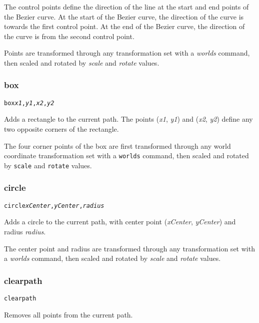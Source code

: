 The control points define the direction of the line at the start and
end points of the Bezier curve.
At the start of the Bezier curve, the direction of the curve is towards
the first control point.
At the end of the Bezier curve, the direction of the curve is from
the second control point.

Points are transformed through any
transformation set with a \textit{worlds} command,
then scaled and rotated by \textit{scale}
and \textit{rotate} values.

\subsubsection{box}

\begin{alltt}
box \textit{x1}, \textit{y1}, \textit{x2}, \textit{y2}
\end{alltt}

Adds a rectangle to the current path.
The points
(\textit{x1}, \textit{y1}) and (\textit{x2}, \textit{y2}) define
any two opposite corners of the rectangle.

The four corner points of the box
are first transformed through any world coordinate
transformation set with a \texttt{worlds} command,
then scaled and rotated by \texttt{scale}
and \texttt{rotate} values.

\subsubsection{circle}

\begin{alltt}
circle \textit{xCenter}, \textit{yCenter}, \textit{radius}
\end{alltt}

Adds a circle to the current path, with center
point (\textit{xCenter}, \textit{yCenter}) and radius
\textit{radius}.

The center point and radius are transformed through any
transformation set with a \textit{worlds} command,
then scaled and rotated by \textit{scale}
and \textit{rotate} values.

\subsubsection{clearpath}

\begin{alltt}
clearpath
\end{alltt}

Removes all points from the current path.

